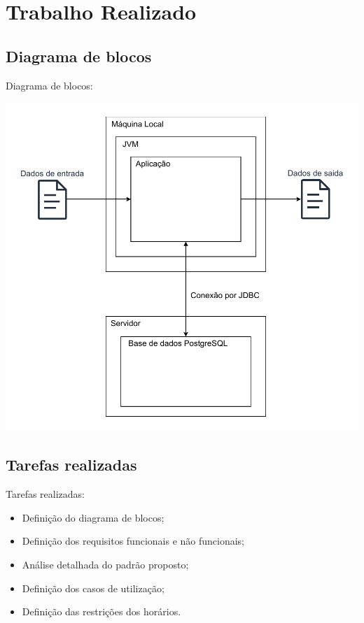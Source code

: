 \documentclass[11]{beamer}
\begin{document}
    \section{Trabalho Realizado}

    \subsection{Diagrama de blocos}

    \begin{frame}
        Diagrama de blocos:
        \begin{center}
            \includegraphics[width=.85\linewidth]{img/diagrama-blocos.pdf}
        \end{center}
    \end{frame}

    \subsection{Tarefas realizadas}

    \begin{frame}
        \justifying
        Tarefas realizadas:
        \begin{itemize}
            \item Definição do diagrama de blocos;
            \item Definição dos requisitos funcionais e não funcionais;
            \item Análise detalhada do padrão proposto;
            \item Definição dos casos de utilização;
            \item Definição das restrições dos horários.
        \end{itemize}
    \end{frame}
\end{document}
